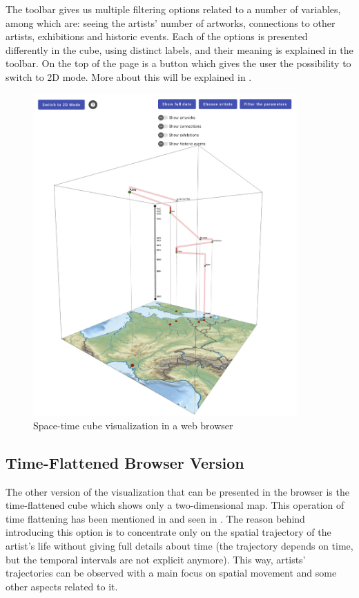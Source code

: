 The toolbar gives us multiple filtering options related to a number of variables, among which are: seeing the artists' number of artworks,
connections to other artists, exhibitions and historic events. Each of the options is presented differently in the cube, using distinct labels,
and their meaning is explained in the toolbar. On the top of the page is a button which gives the user the possibility to switch to 2D mode. More
about this will be explained in .

\begin{figure}[hbt!]
    \begin{center}
        \includegraphics[width=0.9\textwidth]{graphics/3-implementation/10}
    \end{center}
    \caption{Space-time cube visualization in a web browser}
    \label{fig:figure3.10}
\end{figure}

\clearpage

\subsection{Time-Flattened Browser Version}\label{subsec:time-flattened-version}
The other version of the visualization that can be presented in the browser is the time-flattened cube which shows only a two-dimensional map. This
operation of time flattening has been mentioned in  and seen in . The reason behind introducing
this option is to concentrate only on the spatial trajectory of the artist's life without giving full details about time (the trajectory depends on
time, but the temporal intervals are not explicit anymore). This way, artists' trajectories can be observed with a main focus on spatial
movement and some other aspects related to it.

